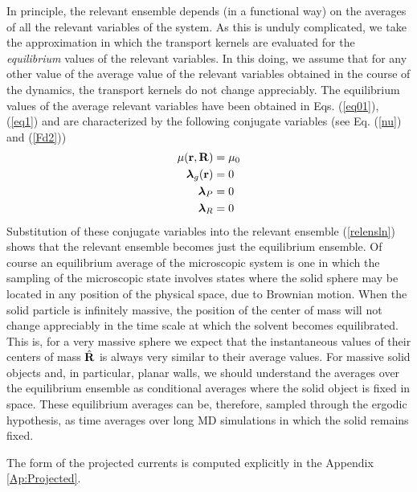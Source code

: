 \documentclass[b5paper,openright,11pt]{book}
\newcommand{\Tirar}[1]{{\color{Magenta}#1}}   %
\begin{document}
In principle, the  relevant ensemble depends (in a  functional way) on
the averages of all the relevant  variables of the system.  As this is
unduly complicated, we  take the approximation in  which the transport
kernels are evaluated for the {\em equilibrium} values of the relevant
variables. In  this doing, we assume  that for any other  value of the
average value of the relevant variables  obtained in the course of the
dynamics,  the  transport  kernels  do not  change  appreciably.   The
equilibrium  values  of  the  average  relevant  variables  have  been
obtained in  Eqs. (\ref{eq01}),  (\ref{eq1}) and are  characterized by
the following conjugate variables (see Eq. (\ref{nu}) and (\ref{Fd2}))
\begin{align}
\mu({\bf r},{\bf R})&=\mu_0
\nonumber\\
\boldsymbol{\lambda}_g({\bf r})&=0
\nonumber\\
\boldsymbol{\lambda}_P&=0
\nonumber\\
\boldsymbol{\lambda}_R&=0
\end{align}
Substitution of  these conjugate variables into  the relevant ensemble
(\ref{relensln})  shows that  the relevant  ensemble becomes  just the
equilibrium  ensemble.   Of  course  an  equilibrium  average  of  the
microscopic system  is one  in which the  sampling of  the microscopic
state involves states where the solid sphere may be located in any 
position of the physical space, due to Brownian motion. When the solid
particle is  infinitely massive,  the position of  the center  of mass
will not  change appreciably in  the time  scale at which  the solvent
becomes equilibrated.   This is, for  a very massive sphere  we expect
that the instantaneous  values of their centers of  mass $\hat{\bf R}$
is  always very  similar to  their average  values. For  massive solid
objects and,  in particular,  planar walls,  we should  understand the
averages over  the equilibrium ensemble as  conditional averages where
the solid  object is fixed  in space.  These equilibrium  averages can
be,  therefore,  sampled  through  the  ergodic  hypothesis,  as  time
averages over long MD simulations in which the solid remains fixed.

\Tirar{The form of the projected currents is computed explicitly in the Appendix \ref{Ap:Projected}.}
\end{document}
